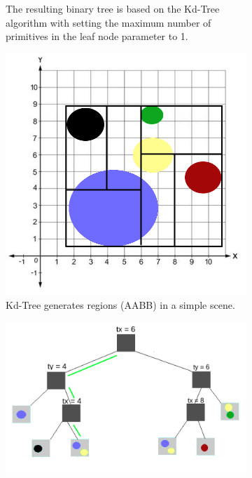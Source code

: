 \documentclass[11pt,a4paper]{article}
\begin{document}
\begin{figure}[H]
\begin{subfigure}[b]{0.6\textwidth}
         \caption{The resulting binary tree is based on the Kd-Tree algorithm with setting the maximum number of primitives in the leaf node parameter to 1.}
         \label{fig:kdtreeexampleb}
     \end{subfigure}
     \hfill
     \begin{subfigure}[b]{0.3\textwidth}
         \centering
         \captionsetup{justification=centering}
         \includegraphics[width=\textwidth]{images/kdtree/visaul_scene_2_new.png}
         \caption{Kd-Tree generates regions (AABB) in a simple scene.}
         \label{fig:pi_5000}
     \end{subfigure}
     \hfill
     \begin{subfigure}[b]{0.6\textwidth}
         \centering
         \captionsetup{justification=centering}
         \includegraphics[width=\textwidth]{images/kdtree/visual_tree_2_new.png}

\end{subfigure}
\end{figure}
\end{document}
